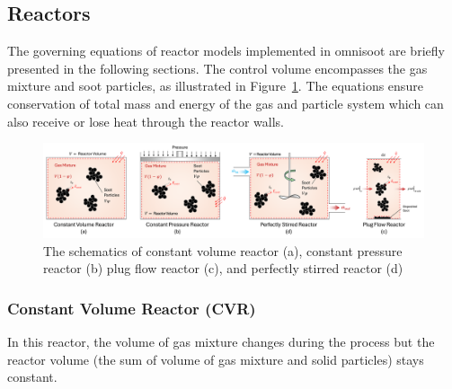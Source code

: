 \subsection{Reactors}

The governing equations of reactor models implemented in omnisoot are briefly presented in the following sections. The control volume encompasses the gas mixture and soot particles, as illustrated in Figure~\ref{fig:reactors}. The equations ensure conservation of total mass and energy of the gas and particle system which can also receive or lose heat through the reactor walls.


\begin{figure}[H]
	\centering
	\includegraphics[width=1\textwidth]{Figures/Theory/reactors.pdf}
	\caption{The schematics of constant volume reactor (a), constant pressure reactor (b) plug flow reactor (c), and perfectly stirred reactor (d)}
	\label{fig:reactors} 
\end{figure}


\subsubsection{Constant Volume Reactor (CVR)}
\label{sec:cvr}
In this reactor, the volume of gas mixture changes during the process but the reactor volume (the sum of volume of gas mixture and solid particles) stays constant.

 
